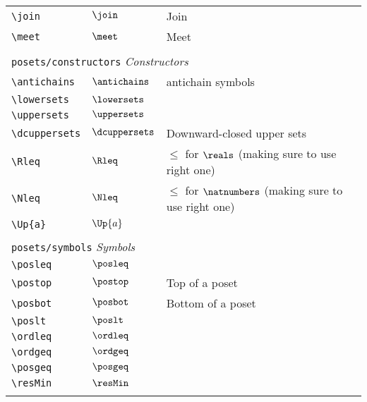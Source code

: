 \begin{longtable}{lll}
 \hline
{\color[rgb]{0.5,0.5,0.5}\texttt{\textbackslash join}} & $\join$ &  Join\\ 
 {\color[rgb]{0.5,0.5,0.5}\texttt{\textbackslash meet}} & $\meet$ &  Meet\\ 
  &  & \\ 
 \multicolumn{3}{l}{{\color[rgb]{0.5,0.5,0.5}\texttt{posets/constructors}} \emph{Constructors}}\\ 
 \hline
{\color[rgb]{0.5,0.5,0.5}\texttt{\textbackslash antichains}} & $\antichains$ &  antichain symbols\\ 
 {\color[rgb]{0.5,0.5,0.5}\texttt{\textbackslash lowersets}} & $\lowersets$ & \\ 
 {\color[rgb]{0.5,0.5,0.5}\texttt{\textbackslash uppersets}} & $\uppersets$ & \\ 
 {\color[rgb]{0.5,0.5,0.5}\texttt{\textbackslash dcuppersets}} & $\dcuppersets$ &  Downward-closed upper sets\\ 
 {\color[rgb]{0.5,0.5,0.5}\texttt{\textbackslash Rleq}} & $\Rleq$ &  $\leq$ for $\reals$ (making sure to use right one)\\ 
 {\color[rgb]{0.5,0.5,0.5}\texttt{\textbackslash Nleq}} & $\Nleq$ &  $\leq$ for $\natnumbers$ (making sure to use right one)\\ 
 {\color[rgb]{0.5,0.5,0.5}\texttt{\textbackslash Up\{a\}}} & $\Up{a}$ & \\ 
  &  & \\ 
 \multicolumn{3}{l}{{\color[rgb]{0.5,0.5,0.5}\texttt{posets/symbols}} \emph{Symbols}}\\ 
 \hline
{\color[rgb]{0.5,0.5,0.5}\texttt{\textbackslash posleq}} & $\posleq$ & \\ 
 {\color[rgb]{0.5,0.5,0.5}\texttt{\textbackslash postop}} & $\postop$ &  Top of a poset\\ 
 {\color[rgb]{0.5,0.5,0.5}\texttt{\textbackslash posbot}} & $\posbot$ &  Bottom of a poset\\ 
 {\color[rgb]{0.5,0.5,0.5}\texttt{\textbackslash poslt}} & $\poslt$ & \\ 
 {\color[rgb]{0.5,0.5,0.5}\texttt{\textbackslash ordleq}} & $\ordleq$ & \\ 
 {\color[rgb]{0.5,0.5,0.5}\texttt{\textbackslash ordgeq}} & $\ordgeq$ & \\ 
 {\color[rgb]{0.5,0.5,0.5}\texttt{\textbackslash posgeq}} & $\posgeq$ & \\ 
 {\color[rgb]{0.5,0.5,0.5}\texttt{\textbackslash resMin}} & $\resMin$ & \\ 
  &  & \\ 

\end{longtable}
